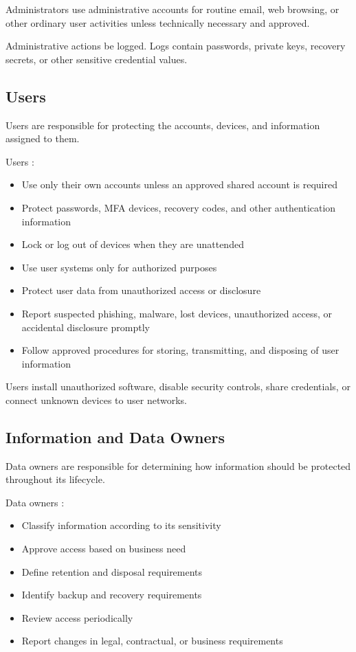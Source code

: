 Administrators \mustnot{} use administrative accounts for routine email, web browsing, or other ordinary user activities unless technically necessary and approved.

Administrative actions \should{} be logged. Logs \mustnot{} contain passwords, private keys, recovery secrets, or other sensitive credential values.

\subsection{Users}

Users are responsible for protecting the accounts, devices, and information assigned to them.

Users \must{}:
\begin{itemize}
    \item Use only their own accounts unless an approved shared account is required
    \item Protect passwords, MFA devices, recovery codes, and other authentication information
    \item Lock or log out of devices when they are unattended
    \item Use user systems only for authorized purposes
    \item Protect user data from unauthorized access or disclosure
    \item Report suspected phishing, malware, lost devices, unauthorized access, or accidental disclosure promptly
    \item Follow approved procedures for storing, transmitting, and disposing of user information
\end{itemize}

Users \mustnot{} install unauthorized software, disable security controls, share credentials, or connect unknown devices to user networks.

\subsection{Information and Data Owners}

Data owners are responsible for determining how information should be protected throughout its lifecycle.

Data owners \must{}:
\begin{itemize}
    \item Classify information according to its sensitivity
    \item Approve access based on business need
    \item Define retention and disposal requirements
    \item Identify backup and recovery requirements
    \item Review access periodically
    \item Report changes in legal, contractual, or business requirements
\end{itemize}

